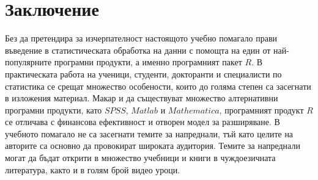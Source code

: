 ﻿\newpage
{}
\chapter*{Заключение}
\thispagestyle{empty}

Без да претендира за изчерпателност настоящото учебно помагало прави въведение в статистическата обработка на данни с помощта на един от най-популярните програмни продукти, а именно програмният пакет $R$. В практическата работа на ученици, студенти, докторанти и специалисти по статистика се срещат множество особености, които до голяма степен са засегнати в изложения материал. Макар и да съществуват множество алтернативни програмни продукти, като $SPSS$, $Matlab$ и $Mathematica$, програмният продукт $R$ се отличава с финансова ефективност и отворен модел за разширяване. В учебното помагало не са засегнати темите за напреднали, тъй като целите на авторите са основно да провокират широката аудитория. Темите за напреднали могат да бъдат открити в множество учебници и книги в чуждоезичната литература, както и в голям брой видео уроци. 

